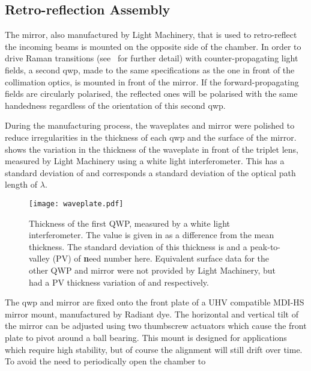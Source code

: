 \subsection{Retro-reflection Assembly}\label{subsec:setup_ramanmirror}
The mirror, also manufactured by Light Machinery, that is used to
retro-reflect the incoming beams is mounted on the opposite side of the
chamber. In order to drive Raman transitions
(see~ for further detail) with
counter-propagating light fields, a second \ac{qwp}, made to the same
specifications as the one in front of the collimation optics, is mounted in
front of the mirror. If the forward-propagating fields are circularly
polarised, the reflected ones will be polarised with the same handedness
regardless of the orientation of this second \ac{qwp}. \par\noindent
During the manufacturing process, the waveplates and mirror were polished to
reduce irregularities in the thickness of each \ac{qwp} and the surface of
the mirror.  shows the variation in the
thickness of the waveplate in front of the triplet lens, measured by Light
Machinery using a white light interferometer. This has a standard deviation
of  and corresponds a standard deviation of the
optical path length of \(\lambda\).
\begin{figure}[!htbp]
	\centering
	\texttt{[image: waveplate.pdf]}
	\caption{Thickness of the first \ac{QWP}, measured by a white light
		interferometer. The value is given in \sivalue{}{\nano\metre} as a difference
		from the mean thickness. The standard deviation of this thickness is
		 and a peak-to-valley (PV) of {\textbf need number
				here}. Equivalent surface data for the other \ac{QWP} and mirror were not
		provided by Light Machinery, but had a PV thickness variation of
		 and  respectively.}
	\label{fig:waveplate_map}
\end{figure}
\par\noindent
The \ac{qwp} and mirror are fixed onto the front plate of a UHV compatible
MDI-HS mirror mount, manufactured by Radiant dye. The horizontal and vertical
tilt of the mirror can be adjusted using two thumbscrew actuators which cause
the front plate to pivot around a ball bearing. This mount is designed for
applications which require high stability, but of course the alignment will
still drift over time. To avoid the need to periodically open the chamber to
